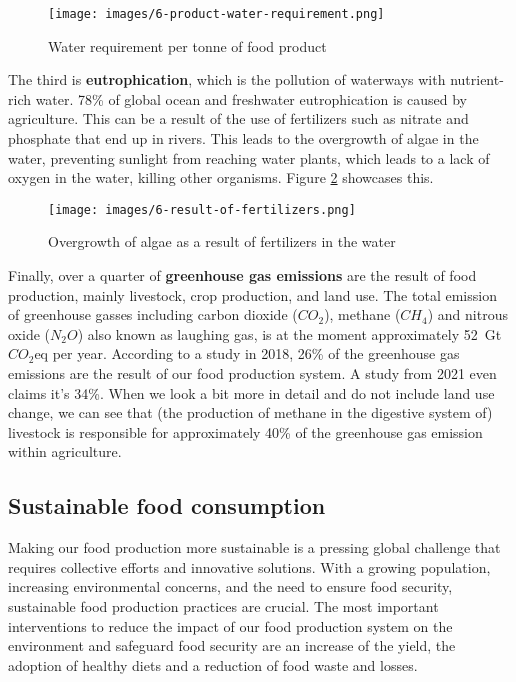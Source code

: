 \documentclass[../summary.tex]{subfiles}
\begin{document}
	\begin{figure}[htbp]
		\centering
		\texttt{[image: images/6-product-water-requirement.png]}
		\caption{Water requirement per tonne of food product}
		\label{fig:production-water-requirement}
	\end{figure}
	
	The third is \textbf{eutrophication}, which is the pollution of waterways with nutrient-rich water. 78\% of global ocean and freshwater eutrophication is caused by agriculture. This can be a result of the use of fertilizers such as nitrate and phosphate that end up in rivers. This leads to the overgrowth of algae in the water, preventing sunlight from reaching water plants, which leads to a lack of oxygen in the water, killing other organisms. Figure \ref{fig:result-of-fertilizers} showcases this.
		\\
	\begin{figure}[htbp]
		\centering
		\texttt{[image: images/6-result-of-fertilizers.png]}
		\caption{Overgrowth of algae as a result of fertilizers in the water}
		\label{fig:result-of-fertilizers}
	\end{figure}

	
	Finally, over a quarter of \textbf{greenhouse gas emissions} are the result of food production, mainly livestock, crop production, and land use. The total emission of greenhouse gasses including carbon dioxide ($CO_{2}$), methane ($CH_{4}$) and nitrous oxide ($N_{2}O$) also known as laughing gas, is at the moment approximately \SI{52}{\giga\tonne}$CO_{2}$eq per year. According to a study in 2018, 26\% of the greenhouse gas emissions are the result of our food production system. A study from 2021 even claims it's 34\%. When we look a bit more in detail and do not include land use change, we can see that (the production of methane in the digestive system of) livestock is responsible for approximately 40\% of the greenhouse gas emission within agriculture.
	
	\subsection{Sustainable food consumption}
	
	Making our food production more sustainable is a pressing global challenge that requires collective efforts and innovative solutions. With a growing population, increasing environmental concerns, and the need to ensure food security, sustainable food production practices are crucial. The most important interventions to reduce the impact of our food production system on the environment and safeguard food security are an increase of the yield, the adoption of healthy diets and a reduction of food waste and losses. 
	
\end{document}
